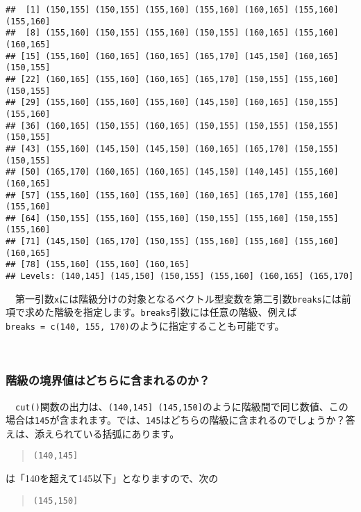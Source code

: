\documentclass[
  12pt,
]{book}
\begin{document}
\begin{verbatim}
##  [1] (150,155] (150,155] (155,160] (155,160] (160,165] (155,160] (155,160]
##  [8] (155,160] (150,155] (155,160] (150,155] (160,165] (155,160] (160,165]
## [15] (155,160] (160,165] (160,165] (165,170] (145,150] (160,165] (150,155]
## [22] (160,165] (155,160] (160,165] (165,170] (150,155] (155,160] (150,155]
## [29] (155,160] (155,160] (155,160] (145,150] (160,165] (150,155] (155,160]
## [36] (160,165] (150,155] (160,165] (150,155] (150,155] (150,155] (150,155]
## [43] (155,160] (145,150] (145,150] (160,165] (165,170] (150,155] (150,155]
## [50] (165,170] (160,165] (160,165] (145,150] (140,145] (155,160] (160,165]
## [57] (155,160] (155,160] (155,160] (160,165] (165,170] (155,160] (155,160]
## [64] (150,155] (155,160] (155,160] (150,155] (155,160] (150,155] (155,160]
## [71] (145,150] (165,170] (150,155] (155,160] (155,160] (155,160] (160,165]
## [78] (155,160] (155,160] (160,165]
## Levels: (140,145] (145,150] (150,155] (155,160] (160,165] (165,170]
\end{verbatim}

　第一引数\texttt{x}には階級分けの対象となるベクトル型変数を第二引数\texttt{breaks}には前項で求めた階級を指定します。\texttt{breaks}引数には任意の階級、例えば\texttt{breaks\ =\ c(140,\ 155,\ 170)}のように指定することも可能です。

　

\hypertarget{ux968eux7d1aux306eux5883ux754cux5024ux306fux3069ux3061ux3089ux306bux542bux307eux308cux308bux306eux304b}{%
\subsubsection*{階級の境界値はどちらに含まれるのか？}\label{ux968eux7d1aux306eux5883ux754cux5024ux306fux3069ux3061ux3089ux306bux542bux307eux308cux308bux306eux304b}}

　\texttt{cut()}関数の出力は、\texttt{(140,145{]}\ (145,150{]}}のように階級間で同じ数値、この場合は\texttt{145}が含まれます。では、\texttt{145}はどちらの階級に含まれるのでしょうか？答えは、添えられている括弧にあります。

\begin{quote}
\texttt{(140,145{]}}
\end{quote}

は「140を超えて145以下」となりますので、次の

\begin{quote}
\texttt{(145,150{]}}
\end{quote}
\end{document}

